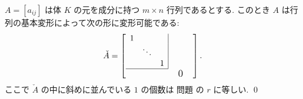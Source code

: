 \documentclass[12pt,twoside]{jarticle}
\begin{document}
\begin{question}[行列の基本変形による行列の簡単化]
  \label{q:PAQ}
  $A=[a_{ij}]$ は体 $K$ の元を成分に持つ $m\times n$ 行列であるとする.
  このとき $A$ は行列の基本変形によって次の形に変形可能である:
  \begin{equation*}
    \check{A} = 
    \left[
      \begin{array}{cccc}
        1 &        & \multicolumn{1}{c|}{}  & \qquad \\
          & \ddots & \multicolumn{1}{c|}{}  & \qquad \\
          &        & \multicolumn{1}{c|}{1} & \qquad \\
        \cline{1-3}
        \vphantom{\bigzerol} & & & \bigzerou \\
      \end{array}
    \right].
  \end{equation*}
  ここで $\check{A}$ の中に斜めに並んでいる $1$ の個数は
  問題  の $r$ に等しい.
  \qed
\end{question}
\end{document}
